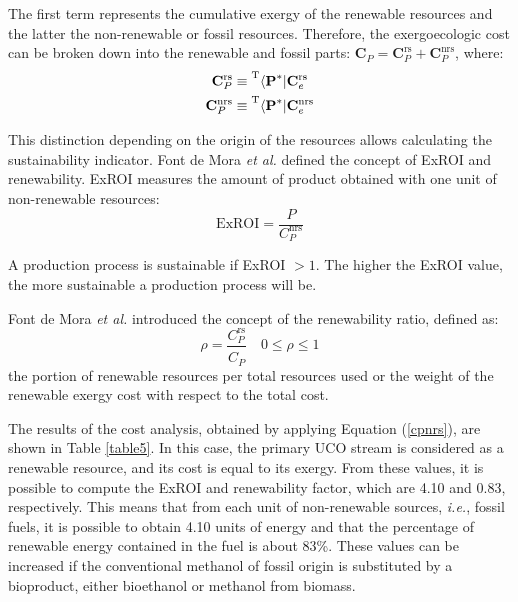 \documentclass[sustainability,article,accept,moreauthors,pdftex,12pt,a4paper]{mdpi}
\newcommand{\tmopcr}[1]{\ensuremath{\prescript{\mathrm{T}}{}{\left\langle {\textbf{#1}^\ast } \right|}}}
\newcommand{\vms}[3][\phantom{\ast}]{\ensuremath{\mathbf{#2}_{#3}^\mathrm{#1}}}
\newcommand{\ems}[3][\phantom{\ast}]{\ensuremath{{#2}_{#3}^\mathrm{#1}}}
\begin{document}
The first term represents the cumulative exergy of the renewable resources and the latter the non-renewable or fossil resources. Therefore, the exergoecologic cost can be broken down into the renewable and fossil parts: $\vms{C}{P}=\vms[rs]{C}{P}+\vms[nrs]{C}{P}$, where:
\begin{equation}
\label{cpnrs}
\begin{split}
 \vms[rs]{C}{P} &\equiv \tmopcr{P} \vms[rs]{C}{e} \\
 \vms[nrs]{C}{P} &\equiv \tmopcr{P} \vms[nrs]{C}{e}
\end{split}
\end{equation}

This distinction depending on the origin of the resources allows calculating the sustainability indicator. Font de Mora \textit{et al.} \cite{FontdeMora2012} defined the concept of ExROI and renewability. ExROI measures the amount of product obtained with one unit of non-renewable resources: 
\begin{equation}
\label{exroi}
\textrm{ExROI}=\frac{P}{\ems[nrs]{C}{P}}
\end{equation}

A production process is sustainable if ExROI $>1$. The higher the ExROI value, the more sustainable a production process will be.

Font de Mora \textit{et al.} \cite{FontdeMora2013} introduced the concept of the renewability ratio, defined as:
\begin{equation}
\label{rho}
\rho=\frac{\ems[rs]{C}{P}}{\ems{C}{P}} \quad 0 \leq \rho \leq 1
\end{equation}
\noindent the portion of renewable resources per total resources used or the weight of the renewable exergy cost with respect to the total cost.

The results of the cost analysis, obtained by applying Equation (\ref{cpnrs}), are shown in Table \ref{table5}. In this case, the primary UCO stream is considered as a renewable resource, and its cost is equal to its exergy. From these values, it is possible to compute the ExROI and renewability factor, which are 4.10 and 0.83, respectively. This means that from each unit of non-renewable sources, \textit{i.e.}, fossil fuels, it is possible to obtain 4.10 units of energy and that the percentage of renewable energy contained in the fuel is about 83\%. These values can be increased if the conventional methanol of fossil origin is substituted by a bioproduct, either bioethanol or methanol from biomass.
\end{document}
